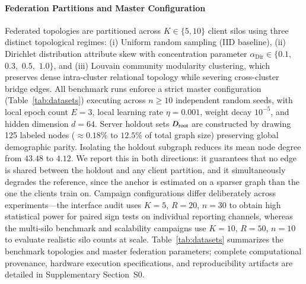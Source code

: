 \paragraph{Federation Partitions and Master Configuration}
Federated topologies are partitioned across $K \in \{5, 10\}$ client silos using three distinct topological regimes: (i) Uniform random sampling (IID baseline), (ii) Dirichlet distribution attribute skew with concentration parameter $\alpha_{\text{Dir}} \in \{0.1,$ $0.3,$ $0.5,$ $1.0\}$, and (iii) Louvain community modularity clustering, which preserves dense intra-cluster relational topology while severing cross-cluster bridge edges. All benchmark runs enforce a strict master configuration (Table~\ref{tab:datasets}) executing across $n \ge 10$ independent random seeds, with local epoch count $E = 3$, local learning rate $\eta = 0.001$, weight decay $10^{-5}$, and hidden dimension $d = 64$. Server holdout sets $D_{\mathrm{root}}$ are constructed by drawing 125 labeled nodes ($\approx 0.18\%$ to $12.5\%$ of total graph size) preserving global demographic parity. Isolating the holdout subgraph reduces its mean node degree from $43.48$ to $4.12$. We report this in both directions: it guarantees that no edge is shared between the holdout and any client partition, and it simultaneously degrades the reference, since the anchor is estimated on a sparser graph than the one the clients train on. Campaign configurations differ deliberately across experiments---the interface audit uses $K=5$, $R=20$, $n=30$ to obtain high statistical power for paired sign tests on individual reporting channels, whereas the multi-silo benchmark and scalability campaigns use $K=10$, $R=50$, $n=10$ to evaluate realistic silo counts at scale. Table~\ref{tab:datasets} summarizes the benchmark topologies and master federation parameters; complete computational provenance, hardware execution specifications, and reproducibility artifacts are detailed in Supplementary Section~S0.

